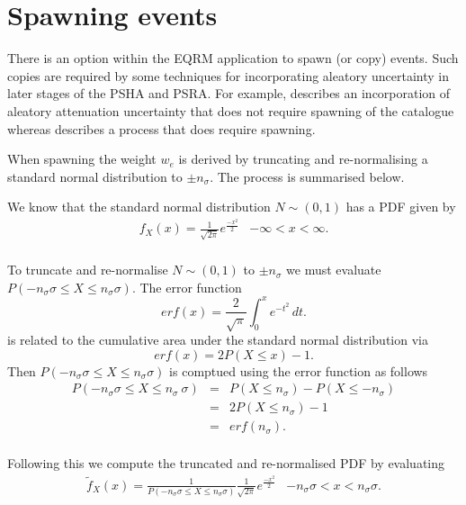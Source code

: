 \section{Spawning events}
\label{source:spawning}


There is an option within the EQRM application to spawn (or copy)
events. Such copies are required by some techniques for
incorporating aleatory uncertainty in later stages of the PSHA and
PSRA. For example,  describes an
incorporation of aleatory attenuation uncertainty that does not
require spawning of the catalogue whereas
 describes a process that does require
spawning. 

When spawning the weight $w_e$ is derived by
truncating and re-normalising a standard normal distribution to
$\pm n_\sigma$. The process is summarised below.

We know that the standard normal distribution $ N \sim (0,1)$ has
a PDF given by
\begin{equation}
\begin{array}{lr}
f_X(x)=\frac{1}{\sqrt{2\pi}}e^{\frac{-x^2}{2}} & - \infty <x<
\infty.
\\
\end{array}
\end{equation}

To truncate and re-normalise $N \sim (0,1)$ to $\pm n_\sigma$ we
must evaluate $P(-n_\sigma \sigma \leq X \leq n_\sigma \sigma)$.
The error function
\begin{equation}
erf(x) = \frac{2}{\sqrt{\pi}} \int_{0}^{x} e^{-t^2} \, dt.
\end{equation}
is related to the cumulative area under the standard normal
distribution via
\begin{equation}
erf(x) = 2P(X \leq x)-1.
\end{equation}
Then $P(-n_\sigma
\sigma \leq X \leq n_\sigma \sigma)$ is comptued using the error function as
follows
\begin{equation}
\begin{array}{rcl}
P(-n_\sigma \sigma \leq X \leq n_\sigma\ \sigma)  & = & P(X \leq
n_\sigma)-P(X \leq -n_\sigma) \\
   & = & 2P(X \leq n_\sigma)-1 \\
    & = & erf(n_\sigma) . \\
\end{array}
\end{equation}

Following this we compute the truncated and
re-normalised PDF by evaluating
\begin{equation}
\begin{array}{lr}
\tilde{f}_X(x)= \frac{1}{P(-n_\sigma \sigma \leq X \leq n_\sigma
\sigma)}
\frac{1}{\sqrt{2\pi}}e^{ \frac{-x^2}{2}} & -n_\sigma \sigma <x< n_\sigma \sigma. \\
\end{array}
\end{equation}

